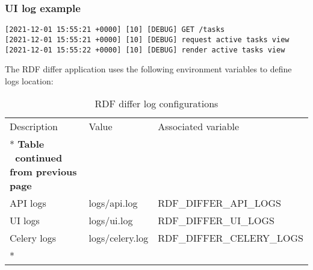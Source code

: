 \subsubsection{UI log example}
\begin{lstlisting}
[2021-12-01 15:55:21 +0000] [10] [DEBUG] GET /tasks
[2021-12-01 15:55:21 +0000] [10] [DEBUG] request active tasks view
[2021-12-01 15:55:22 +0000] [10] [DEBUG] render active tasks view
\end{lstlisting}

The RDF differ application uses the following environment variables to define logs location:

\begin{longtable}[c]{@{}p{3.5cm}p{3.5cm}l@{}}
	\toprule
	Description & Value           & Associated variable         \\* \midrule
	\endfirsthead
	\multicolumn{3}{c}%
	{{\bfseries Table \thetable\ continued from previous page}} \\
	\endhead
	\bottomrule
	\endfoot
	\endlastfoot
	API logs    & logs/api.log    & RDF\_DIFFER\_API\_LOGS      \\
	UI logs     & logs/ui.log     & RDF\_DIFFER\_UI\_LOGS       \\
	Celery logs & logs/celery.log & RDF\_DIFFER\_CELERY\_LOGS   \\* \bottomrule
	\caption{RDF differ log configurations}
	\label{tab:rdf-differ-log}                                  \\
\end{longtable}


